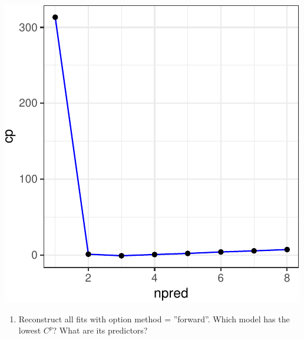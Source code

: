 \documentclass[]{article}
\newenvironment{Shaded}{\begin{snugshade}}{\end{snugshade}}
\newcommand{\DataTypeTok}[1]{\textcolor[rgb]{0.13,0.29,0.53}{#1}}
\newcommand{\DecValTok}[1]{\textcolor[rgb]{0.00,0.00,0.81}{#1}}
\newcommand{\KeywordTok}[1]{\textcolor[rgb]{0.13,0.29,0.53}{\textbf{#1}}}
\newcommand{\NormalTok}[1]{#1}
\newcommand{\OperatorTok}[1]{\textcolor[rgb]{0.81,0.36,0.00}{\textbf{#1}}}
\newcommand{\StringTok}[1]{\textcolor[rgb]{0.31,0.60,0.02}{#1}}
\providecommand{\tightlist}{%
  \setlength{\itemsep}{0pt}\setlength{\parskip}{0pt}}
\begin{document}
\begin{Shaded}
\end{Shaded}

\begin{center}\includegraphics{sol_A3_files/figure-latex/unnamed-chunk-23-2} \end{center}

\begin{enumerate}
\def\labelenumi{(\alph{enumi})}
\setcounter{enumi}{2}
\tightlist
\item
  Reconstruct all fits with option method = ''forward''. Which model has
  the lowest \(C^p\)? What are its predictors?
\end{enumerate}
\end{document}
